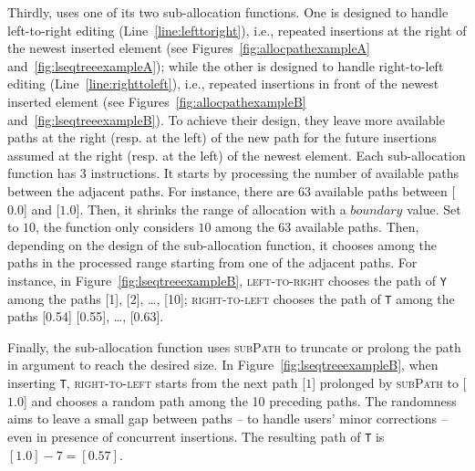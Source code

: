 \noindent Thirdly, \LSEQ uses one of its two sub-allocation functions. One is
designed to handle left-to-right editing (Line~\ref{line:lefttoright}), i.e.,
repeated insertions at the right of the newest inserted element (see
Figures~\ref{fig:allocpathexampleA} and~\ref{fig:lseqtreeexampleA}); while the
other is designed to handle right-to-left editing (Line~\ref{line:righttoleft}),
i.e., repeated insertions in front of the newest inserted element (see
Figures~\ref{fig:allocpathexampleB} and~\ref{fig:lseqtreeexampleB}). To achieve
their design, they leave more available paths at the right (resp. at the left)
of the new path for the future insertions assumed at the right (resp. at the
left) of the newest element. Each sub-allocation function has 3 instructions. It
starts by processing the number of available paths between the adjacent
paths. For instance, there are $63$ available paths between [$0.0$] and
[$1.0$]. Then, it shrinks the range of allocation with a $boundary$ value. Set
to $10$, the function only considers $10$ among the $63$ available paths. Then,
depending on the design of the sub-allocation function, it chooses among the
paths in the processed range starting from one of the adjacent paths. For
instance, in Figure~\ref{fig:lseqtreeexampleB}, \textsc{left-to-right} chooses
the path of \texttt{Y} among the paths [1], [2], \ldots, [10];
\textsc{right-to-left} chooses the path of \texttt{T} among the paths [0.54]
[0.55], \ldots, [0.63].

\noindent Finally, the sub-allocation function uses \textsc{subPath} to truncate
or prolong the path in argument to reach the desired size. In
Figure~\ref{fig:lseqtreeexampleB}, when inserting \texttt{T},
\textsc{right-to-left} starts from the next path [$1$] prolonged by
\textsc{subPath} to [$1.0$] and chooses a random path among the 10 preceding
paths.  The randomness aims to leave a small gap between paths -- to handle
users' minor corrections -- even in presence of concurrent insertions. The
resulting path of \texttt{T} is $[1.0] - 7 = [0.57]$.


